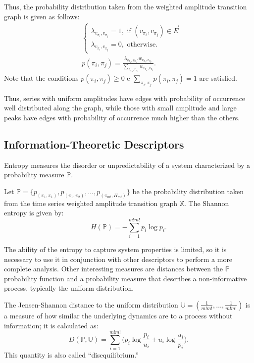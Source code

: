 \documentclass{isprs}
\begin{document}
	Thus, the probability distribution taken from the weighted amplitude transition graph is given as follows:	
	\begin{align}
	&\left\{\begin{array}{l}
	\lambda_{v_{\pi_i}, v_{\pi_j}} = 1, \text{ if } (v_{\pi_i}, v_{\pi_j}) \in \vec{E} \\
	\lambda_{v_{\pi_i}, v_{\pi_j}} = 0, \text{ otherwise}.
	\end{array}\right. \\
	&p(\pi_i, \pi_j) = \frac{\lambda_{v_{\pi_i}, v_{\pi_j}} . w_{v_{\pi_i}, v_{\pi_j}}}{\sum_{v_{\pi_a}, v_{\pi_b}} w_{v_{\pi_a}, v_{\pi_b}}}.
	\end{align}
	Note that the conditions $p(\pi_i, \pi_j) \ge 0$ e $\sum_{\pi_i, \pi_j} p(\pi_i, \pi_j) = 1$ are satisfied.
	
	Thus, series with uniform amplitudes have edges with probability of occurrence well distributed along the graph, while those with small amplitude and large peaks have edges with probability of occurrence much higher than the others.
	
	\subsection{Information-Theoretic Descriptors}\label{HC}
	
	Entropy measures the disorder or unpredictability of a system characterized by a probability measure $\mathbb{P}$.
	
	Let $\mathbb{P} = \{p_{(\pi_1, \pi_1)}, p_{(\pi_1, \pi_2)}, \dots, p_{(\pi_{m!}, \Pi_{m!})} \}$ be the probability distribution taken from the time series weighted amplitude transition graph $\mathbb{X}$.
	The Shannon entropy is given by:	
	\begin{equation}
	H(\mathbb{P}) = -\sum_{i=1}^{m!m!} p_i \log p_i .
	\label{eq:Entropia}
	\end{equation}
	
	The ability of the entropy to capture system properties is limited, so it is necessary to use it in conjunction with other descriptors to perform a more complete analysis.
	Other interesting measures are distances between the $\mathbb{P}$ probability function and a probability measure that describes a non-informative process, typically the uniform distribution.
	
	The Jensen-Shannon distance to the uniform distribution $\mathbb{U} = (\frac{1}{m!m!}, \dots, \frac{1}{m!m!})$ is a measure of how similar the underlying dynamics are to a process without information; it is calculated as:
	\begin{equation}
	D(\mathbb{P}, \mathbb{U}) = \sum_{i=1}^{m!m!} \Big(p_i \log\frac{p_i}{u_i} +
	u_i \log\frac{u_i}{p_i}
	\Big).
	\end{equation}
	This quantity is also called ``disequilibrium.''
	
\end{document}
